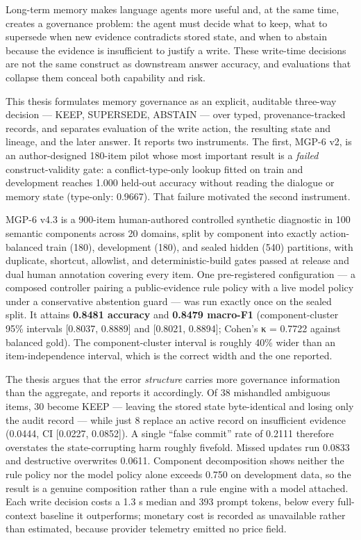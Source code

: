 Long-term memory makes language agents more useful and, at the same
time, creates a governance problem: the agent must decide what to keep,
what to supersede when new evidence contradicts stored state, and when
to abstain because the evidence is insufficient to justify a write.
These write-time decisions are not the same construct as downstream
answer accuracy, and evaluations that collapse them conceal both
capability and risk.

This thesis formulates memory governance as an explicit, auditable
three-way decision --- KEEP, SUPERSEDE, ABSTAIN --- over typed,
provenance-tracked records, and separates evaluation of the write
action, the resulting state and lineage, and the later answer. It
reports two instruments. The first, MGP-6 v2, is an author-designed
180-item pilot whose most important result is a \emph{failed}
construct-validity gate: a conflict-type-only lookup fitted on train and
development reaches 1.000 held-out accuracy without reading the dialogue
or memory state (type-only: 0.9667). That failure motivated the second
instrument.

MGP-6 v4.3 is a 900-item human-authored controlled synthetic diagnostic
in 100 semantic components across 20 domains, split by component into
exactly action-balanced train (180), development (180), and sealed
hidden (540) partitions, with duplicate, shortcut, allowlist, and
deterministic-build gates passed at release and dual human annotation
covering every item. One pre-registered configuration --- a composed
controller pairing a public-evidence rule policy with a live model
policy under a conservative abstention guard --- was run exactly once on
the sealed split. It attains \textbf{0.8481 accuracy} and \textbf{0.8479
macro-F1} (component-cluster 95\% intervals {[}0.8037, 0.8889{]} and
{[}0.8021, 0.8894{]}; Cohen's κ = 0.7722 against balanced gold). The
component-cluster interval is roughly 40\% wider than an
item-independence interval, which is the correct width and the one
reported.

The thesis argues that the error \emph{structure} carries more
governance information than the aggregate, and reports it accordingly.
Of 38 mishandled ambiguous items, 30 become KEEP --- leaving the stored
state byte-identical and losing only the audit record --- while just 8
replace an active record on insufficient evidence (0.0444, CI {[}0.0227,
0.0852{]}). A single ``false commit'' rate of 0.2111 therefore
overstates the state-corrupting harm roughly fivefold. Missed updates
run 0.0833 and destructive overwrites 0.0611. Component decomposition
shows neither the rule policy nor the model policy alone exceeds 0.750
on development data, so the result is a genuine composition rather than
a rule engine with a model attached. Each write decision costs a 1.3 s
median and 393 prompt tokens, below every full-context baseline it
outperforms; monetary cost is recorded as unavailable rather than
estimated, because provider telemetry emitted no price field.

